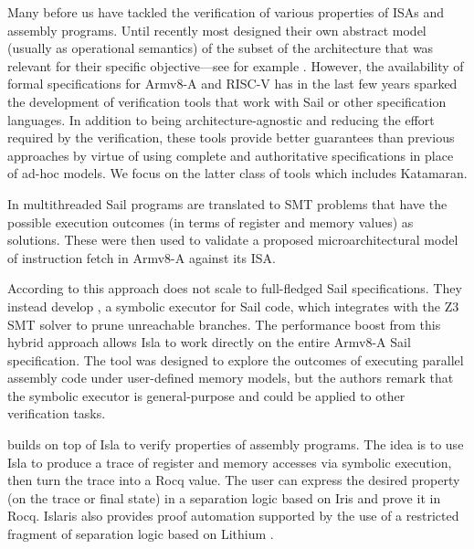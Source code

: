 Many before us have tackled the verification of various properties of ISAs and assembly programs. Until recently most designed their own abstract model (usually as operational semantics) of the subset of the architecture that was relevant for their specific objective---see for example \cite{Georges2021}\cite{Jensen2013}\cite{Guanciale2016}. However, the availability of formal specifications for Armv8-A and RISC-V \cite{Armstrong2019} has in the last few years sparked the development of verification tools that work with Sail or other specification languages. In addition to being architecture-agnostic and reducing the effort required by the verification, these tools provide better guarantees than previous approaches by virtue of using complete and authoritative specifications in place of ad-hoc models. We focus on the latter class of tools which includes Katamaran.

In \cite{Simner2020} multithreaded Sail programs are translated to SMT problems that have the possible execution outcomes (in terms of register and memory values) as solutions. These were then used to validate a proposed microarchitectural model of instruction fetch in Armv8-A against its ISA.

According to \cite{Armstrong2021} this approach does not scale to full-fledged Sail specifications. They instead develop , a symbolic executor for Sail code, which integrates with the Z3 SMT solver to prune unreachable branches. The performance boost from this hybrid approach allows Isla to work directly on the entire Armv8-A Sail specification. The tool was designed to explore the outcomes of executing parallel assembly code under user-defined memory models, but the authors remark that the symbolic executor is general-purpose and could be applied to other verification tasks.

 \cite{Sammler2022} builds on top of Isla to verify properties of assembly programs. The idea is to use Isla to produce a trace of register and memory accesses via symbolic execution, then turn the trace into a Rocq value. The user can express the desired property (on the trace or final state) in a separation logic based on Iris and prove it in Rocq. Islaris also provides proof automation supported by the use of a restricted fragment of separation logic based on Lithium \cite{Sammler2021}.

